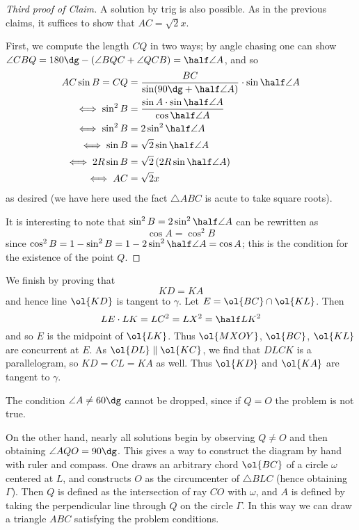 \documentclass[11pt]{scrartcl}
\begin{document}
\begin{proof}
  [Third proof of Claim]
  A solution by trig is also possible.
  As in the previous claims,
  it suffices to show that $AC = \sqrt 2 x$.

  First, we compute the length $CQ$ in two ways;
  by angle chasing one can show
  $\angle CBQ = 180\dg - (\angle BQC + \angle QCB) = \half \angle A$,
  and so
  \begin{align*}
    AC \sin B = CQ &= \frac{BC}{\sin(90\dg+\half\angle A)} \cdot \sin\half\angle A \\
    \iff \sin^2 B &= \frac{\sin A \cdot \sin \half \angle A}{\cos \half \angle A} \\
    \iff \sin^2 B &= 2\sin^2 \half \angle A \\
    \iff \sin B &= \sqrt 2 \sin \half \angle A \\
    \iff 2R \sin B &= \sqrt 2 \left(2R \sin \half \angle A\right) \\
    \iff AC &= \sqrt 2 x
  \end{align*}
  as desired (we have here used the fact $\triangle ABC$ is acute
  to take square roots).

  It is interesting to note that
  $\sin^2 B = 2 \sin^2 \half \angle A$
  can be rewritten as \[ \cos A = \cos^2 B \]
  since $\cos^2 B = 1 - \sin^2 B = 1 - 2 \sin^2 \half \angle A = \cos A$;
  this is the condition for the existence of the point $Q$.
\end{proof}

We finish by proving that \[ KD = KA \]
and hence line $\ol{KD}$ is tangent to $\gamma$.
Let $E = \ol{BC} \cap \ol{KL}$.
Then
\[ LE \cdot LK = LC^2 = LX^2 = \half LK^2 \]
and so $E$ is the midpoint of $\ol{LK}$.
Thus $\ol{MXOY}$, $\ol{BC}$, $\ol{KL}$ are concurrent at $E$.
As $\ol{DL} \parallel \ol{KC}$, we find that $DLCK$ is a parallelogram,
so $KD = CL = KA$ as well.
Thus $\ol{KD}$ and $\ol{KA}$ are tangent to $\gamma$.

\begin{remark*}
  The condition $\angle A \neq 60\dg$ cannot be dropped,
  since if $Q = O$ the problem is not true.

  On the other hand, nearly all solutions
  begin by observing $Q \neq O$ and then obtaining $\angle AQO = 90\dg$.
  This gives a way to construct the diagram by hand
  with ruler and compass.
  One draws an arbitrary chord $\ol{BC}$
  of a circle $\omega$ centered at $L$,
  and constructs $O$ as the circumcenter of $\triangle BLC$
  (hence obtaining $\Gamma$).
  Then $Q$ is defined as the intersection of ray $CO$ with $\omega$,
  and $A$ is defined by taking the perpendicular line through $Q$
  on the circle $\Gamma$.
  In this way we can draw a triangle $ABC$ satisfying the problem conditions.
\end{remark*}
\end{document}

